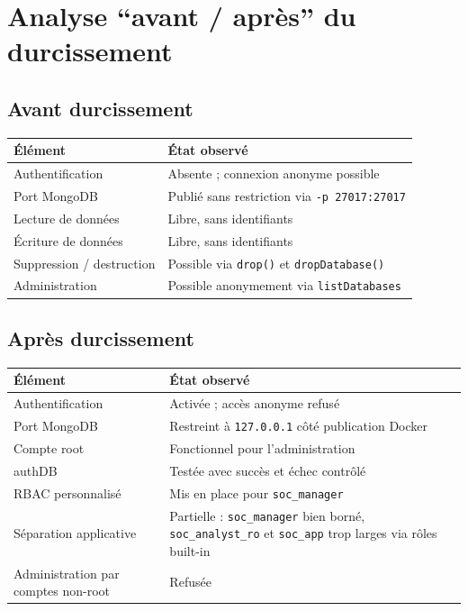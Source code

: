 \documentclass[11pt,a4paper]{article}
\begin{document}
\section{Analyse ``avant / après'' du durcissement}

\subsection{Avant durcissement}

\begin{longtable}{p{4.4cm}p{9.8cm}}
\toprule
\textbf{Élément} & \textbf{État observé} \\
\midrule
Authentification & Absente ; connexion anonyme possible \\
Port MongoDB & Publié sans restriction via \texttt{-p 27017:27017} \\
Lecture de données & Libre, sans identifiants \\
Écriture de données & Libre, sans identifiants \\
Suppression / destruction & Possible via \texttt{drop()} et \texttt{dropDatabase()} \\
Administration & Possible anonymement via \texttt{listDatabases} \\
\bottomrule
\end{longtable}

\subsection{Après durcissement}

\begin{longtable}{p{4.4cm}p{9.8cm}}
\toprule
\textbf{Élément} & \textbf{État observé} \\
\midrule
Authentification & Activée ; accès anonyme refusé \\
Port MongoDB & Restreint à \texttt{127.0.0.1} côté publication Docker \\
Compte root & Fonctionnel pour l'administration \\
authDB & Testée avec succès et échec contrôlé \\
RBAC personnalisé & Mis en place pour \texttt{soc\_manager} \\
Séparation applicative & Partielle : \texttt{soc\_manager} bien borné, \texttt{soc\_analyst\_ro} et \texttt{soc\_app} trop larges via rôles built-in \\
Administration par comptes non-root & Refusée \\
\bottomrule
\end{longtable}
\end{document}
